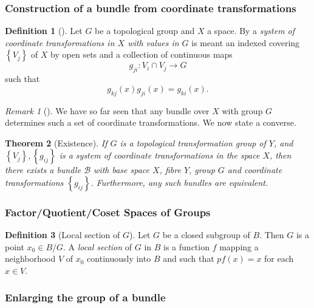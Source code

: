\documentclass[reqno]{amsart}
\newtheorem{theorem}{Theorem}[section]
\theoremstyle{definition}
\newtheorem{definition}[theorem]{Definition}
\theoremstyle{remark}
\newtheorem*{remark}{Remark}
\begin{document}
\subsubsection{Construction of a bundle from coordinate
transformations}
\begin{definition}[]
    Let $G$ be a topological group and $X$ a space.
    By a \textit{system of coordinate transformations in
    $X$ with values in $G$} is meant an indexed covering
    $\left\{ V_j \right\} $ of $X$ by open sets and
    a collection of continuous maps
    \[
    g_{ji} \colon V_{i} \cap V_j \to G
    \] 
    such that
     \[
    g_{kj}(x) g_{ji}(x) = g_{ki}(x).
    \] 
\end{definition}

\begin{remark}[]
    We have so far seen that any bundle over
    $X$ with group $G$ determines such a set of
    coordinate transformations. We now state a converse.
\end{remark}

\begin{theorem}[Existence]\label{Existence-theorem}
    If $G$ is a topological transformation group of
    $Y$, and $\left\{ V_j \right\} , 
    \left\{ g_{ij} \right\} $ is a system
    of coordinate transformations in the space
    $X$, then there exists a bundle $\mathcal{B}$ with
    base space $X$, fibre $Y$, group $G$ and
    coordinate transformations
    $\left\{ g_{ij} \right\} $. Furthermore,
    any such bundles are equivalent.
\end{theorem}

\subsubsection{Factor/Quotient/Coset Spaces of Groups}


\begin{definition}[Local section of $G$]
     Let $G$ be a closed subgroup of $B$. Then
     $G$ is a point
     $x_0 \in B / G$. A \textit{local section}
     of $G$ in $B$ is a function $f $ mapping a neighborhood
     $V$ of $x_0$ continuously into $B$ and such that
     $p f (x) = x$ for each $x \in V$.
\end{definition}



\subsubsection{Enlarging the group of a bundle}
\end{document}
